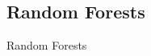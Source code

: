 \documentclass[xcolor=pdftex,dvipsnames,table]{beamer}
\begin{document}


\subsection{Random Forests}
\begin{frame}[plain,c]
\begin{center}
\Huge Random Forests
\end{center}
\end{frame}


\end{document}
